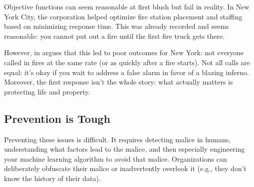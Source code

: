 Objective functions can seem reasonable at first blush but fail in
reality.  In New York City, the  corporation helped optimize
fire station placement and staffing based on minimizing response
time.  This was already recorded and seems reasonable: you cannot put
out a fire until the first fire truck gets there.


However, \citet{spufford-10} in  argues that this led to poor
outcomes for New York: not everyone called in fires at the same rate
(or as quickly after a fire starts).  Not all calls are equal: it's
okay if you wait to address a false alarm in favor of a blazing
inferno.  Moreover, the first response isn't the whole story: what
actually matters is protecting life and property.  

\subsection{Prevention is Tough}

Preventing these issues is difficult.  It requires detecting malice in
humans, understanding what factors lead to the malice, and then
especially engineering your machine learning algorithm to avoid that
malice.  Organizations can deliberately obfuscate their malice or
inadvertently overlook it (e.g., they don't know the history of their
data).

